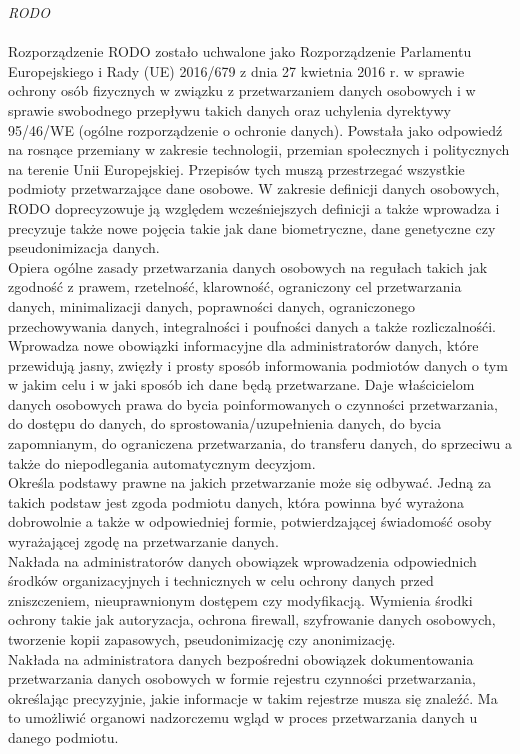 \documentclass[en, noamssymb]{mgr}
\begin{document}
\indent \textit{RODO} \\ \\
\indent Rozporządzenie RODO zostało uchwalone jako Rozporządzenie Parlamentu Europejskiego i Rady (UE) 2016/679 z dnia 27 kwietnia 2016 r. w sprawie ochrony osób fizycznych w związku z przetwarzaniem danych osobowych i w sprawie
swobodnego przepływu takich danych oraz uchylenia dyrektywy 95/46/WE (ogólne
rozporządzenie o ochronie danych). Powstała jako odpowiedź na rosnące przemiany w zakresie technologii, przemian społecznych i politycznych na terenie Unii Europejskiej. Przepisów tych muszą przestrzegać wszystkie podmioty przetwarzające dane osobowe.
\indent W zakresie definicji danych osobowych, RODO doprecyzowuje ją względem wcześniejszych definicji a także wprowadza i precyzuje także nowe pojęcia takie jak dane biometryczne, dane genetyczne czy pseudonimizacja danych.\\
\indent Opiera ogólne zasady przetwarzania danych osobowych na regułach takich jak zgodność z prawem, rzetelność, klarowność, ograniczony cel przetwarzania danych, minimalizacji danych, poprawności danych, ograniczonego przechowywania danych, integralności i poufności danych a także rozliczalnośći.\\
\indent Wprowadza nowe obowiązki informacyjne dla administratorów danych, które przewidują jasny, zwięzły i prosty sposób informowania podmiotów danych o tym w jakim celu i w jaki sposób ich dane będą przetwarzane. Daje właścicielom danych osobowych prawa do bycia poinformowanych o czynności przetwarzania, do dostępu do danych, do sprostowania/uzupełnienia danych, do bycia zapomnianym, do ograniczena przetwarzania, do transferu danych, do sprzeciwu a także do niepodlegania automatycznym decyzjom.\\
\indent Określa podstawy prawne na jakich przetwarzanie może się odbywać. Jedną za takich podstaw jest zgoda podmiotu danych, która powinna być wyrażona dobrowolnie a także w odpowiedniej formie, potwierdzającej świadomość osoby wyrażającej zgodę na przetwarzanie danych. \\
\indent Nakłada na administratorów danych obowiązek wprowadzenia odpowiednich środków organizacyjnych i technicznych w celu ochrony danych przed zniszczeniem, nieuprawnionym dostępem czy modyfikacją. Wymienia środki ochrony takie jak autoryzacja, ochrona firewall, szyfrowanie danych osobowych, tworzenie kopii zapasowych, pseudonimizację czy anonimizację.\\
\indent Nakłada na administratora danych bezpośredni obowiązek dokumentowania przetwarzania danych osobowych w formie rejestru czynności przetwarzania, określając precyzyjnie, jakie informacje w takim rejestrze musza się znaleźć. Ma to umożliwić organowi nadzorczemu wgląd w proces przetwarzania danych u danego podmiotu.\\
\end{document}
